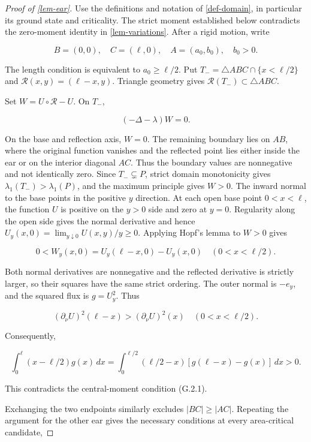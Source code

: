 \documentclass[11pt,a4paper]{article}
\theoremstyle{proofmanuscript}
\begin{document}
\begin{proof}[Proof of \ref{lem-ear}]

Use the definitions and notation of \ref{def-domain}, in particular its ground state and criticality. The strict moment established below contradicts the zero-moment identity in \ref{lem-variations}. After a rigid motion, write

\[
B=(0,0),\quad C=(\ell,0),\quad A=(a_0,b_0),\quad b_0>0.
\]

The length condition is equivalent to \(a_0\ge\ell/2\). Put \(T_-=\triangle ABC\cap\{x<\ell/2\}\) and \(\mathcal R(x,y)=(\ell-x,y)\). Triangle geometry gives \(\mathcal R(T_-)\subset\triangle ABC\).

Set \(W=U\circ\mathcal R-U\). On \(T_-\),

\[
(-\Delta-\lambda)W=0.
\]

On the base and reflection axis, \(W=0\). The remaining boundary lies on \(AB\), where the original function vanishes and the reflected point lies either inside the ear or on the interior diagonal \(AC\). Thus the boundary values are nonnegative and not identically zero. Since \(T_-\subsetneq P\), strict domain monotonicity gives \(\lambda_1(T_-)>\lambda_1(P)\), and the maximum principle gives \(W>0\). The inward normal to the base points in the positive \(y\) direction. At each open base point \(0<x<\ell\), the function \(U\) is positive on the \(y>0\) side and zero at \(y=0\). Regularity along the open side gives the normal derivative and hence \(U_y(x,0)=\lim_{y\downarrow0}U(x,y)/y\ge0\). Applying Hopf's lemma to \(W>0\) gives

\[
0< W_y(x,0)=U_y(\ell-x,0)-U_y(x,0)\quad(0<x<\ell/2).
\]

Both normal derivatives are nonnegative and the reflected derivative is strictly larger, so their squares have the same strict ordering. The outer normal is \(-e_y\), and the squared flux is \(g=U_y^2\). Thus

\[
(\partial_\nu U)^2(\ell-x)>(\partial_\nu U)^2(x)
\quad(0<x<\ell/2).
\]

Consequently,

\[
\int_0^\ell(x-\ell/2)g(x)\,dx
=\int_0^{\ell/2}(\ell/2-x)[g(\ell-x)-g(x)]\,dx>0.
\]

This contradicts the central-moment condition (G.2.1).

Exchanging the two endpoints similarly excludes \(|BC|\ge|AC|\). Repeating the argument for the other ear gives the necessary conditions at every area-critical candidate,


\end{proof}
\end{document}
